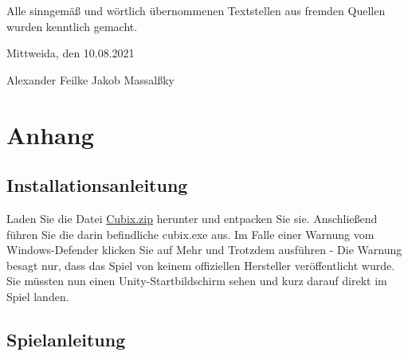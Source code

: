 \documentclass[a4paper,10pt,ngerman,fontsize=12pt]{scrreprt}
\begin{document}
Alle sinngemä{\ss} und wörtlich übernommenen Textstellen aus fremden Quellen wurden kenntlich gemacht.

Mittweida, den 10.08.2021

\vspace{2cm}

Alexander Feilke \hspace{4cm} Jakob Massal{\ss}ky





\newpage
\newpage
\chapter{Anhang}




\section{Installationsanleitung}
Laden Sie die Datei \href{https://www.dropbox.com/s/g82vexjznq1x9dd/Cubix.zip?dl=1}{Cubix.zip} herunter und entpacken Sie sie. Anschließend führen Sie die darin befindliche cubix.exe aus.
Im Falle einer Warnung vom Windows-Defender klicken Sie auf Mehr und Trotzdem ausführen - Die Warnung besagt nur, dass das Spiel von keinem offiziellen Hersteller veröffentlicht wurde.
Sie müssten nun einen Unity-Startbildschirm sehen und kurz darauf direkt im Spiel landen.




\section{Spielanleitung}
\lipsum[3]
\end{document}
